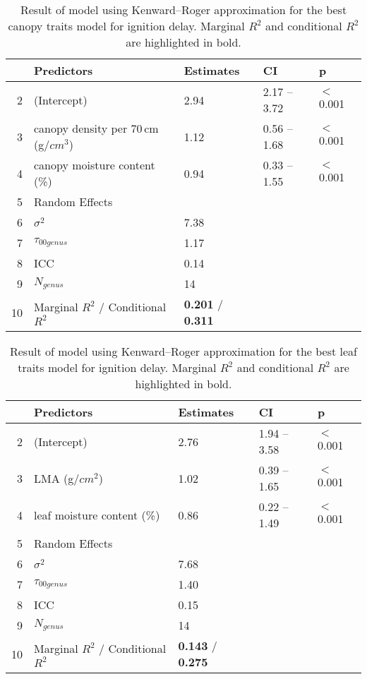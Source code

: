 \documentclass[12pt]{report}
\begin{document}
\begin{table}
\centering
\caption{Result of model using Kenward--Roger approximation for the best canopy traits model for ignition delay. Marginal $R^2$ and conditional $R^2$ are highlighted in bold.}
\begin{tabular}{rllll}
  \hline
 & Predictors & Estimates & CI & p \\ 
  \hline
2 & (Intercept) & 2.94 & 2.17 – 3.72 & $<$0.001 \\ 
3 & canopy density per 70\,cm (g/{$cm^3$}) & 1.12 & 0.56 – 1.68 & $<$0.001 \\ 
  4 & canopy moisture content (\%) & 0.94 & 0.33 – 1.55 & $<$0.001 \\ 
  5 & Random Effects &  &  &  \\ 
  6 & $\sigma^2$ & 7.38 &  &  \\ 
  7 & $\tau_{00 genus}$ & 1.17 &  &  \\ 
  8 & ICC & 0.14 &  &  \\ 
  9 & $N_{genus}$ & 14 &  &  \\ 
  10 & Marginal $R^2$ / Conditional $R^2$ & \textbf{0.201} / \textbf{0.311} &  &  \\  
   \hline
\end{tabular}
\end{table}


\begin{table}[ht]
\centering
\caption{Result of model using Kenward--Roger approximation for the best leaf traits model for ignition delay. Marginal $R^2$ and conditional $R^2$ are highlighted in bold.}
\begin{tabular}{rllll}
  \hline
 & Predictors & Estimates & CI & p \\ 
  \hline
2 & (Intercept) & 2.76 & 1.94 – 3.58 & $<$0.001 \\ 
  3 & LMA (g/{$cm^2$}) & 1.02 & 0.39 – 1.65 & $<$0.001 \\ 
  4 & leaf moisture content (\%) & 0.86 & 0.22 – 1.49 & $<$0.001 \\ 
  5 & Random Effects &  &  &  \\ 
  6 & $\sigma^2$ & 7.68 &  &  \\ 
  7 & $\tau_{00 genus}$ & 1.40 &  &  \\ 
  8 & ICC & 0.15 &  &  \\ 
  9 & $N_{genus}$ & 14 &  &  \\ 
  10 & Marginal $R^2$ / Conditional $R^2$ & \textbf{0.143} / \textbf{0.275} &  &  \\ 
   \hline
\end{tabular}
\end{table}
\end{document}
